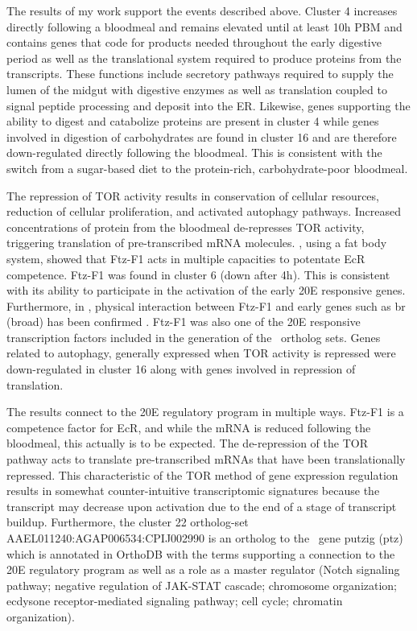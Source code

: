 The results of my work support the events described above.
%
Cluster 4 increases directly following a bloodmeal and remains elevated until at least 10h \gls{PBM} and contains genes that code for products needed throughout the early digestive period as well as the translational system required to produce proteins from the transcripts.
%
These functions include secretory pathways required to supply the lumen of the midgut with digestive enzymes as well as translation coupled to signal peptide processing and deposit into the \gls{ER}.
%
Likewise, genes supporting the ability to digest and catabolize proteins are present in cluster 4 while genes involved in digestion of carbohydrates are found in cluster 16 and are therefore down-regulated directly following the bloodmeal.
%
This is consistent with the switch from a sugar-based diet to the protein-rich, carbohydrate-poor bloodmeal. 


The repression of \gls{TOR} activity results in conservation of cellular resources, reduction of cellular proliferation, and activated autophagy pathways.
%
Increased concentrations of protein from the bloodmeal de-represses \gls{TOR} activity, triggering translation of pre-transcribed mRNA molecules.
%
\citet{Zhu2006}, using a fat body system, showed that Ftz-F1 acts in multiple capacities to potentate \gls{EcR} competence.
%
Ftz-F1 was found in cluster 6 (down after 4h).
%
This is consistent with its ability to participate in the activation of the early \gls{20E} responsive genes.
%
Furthermore, in \Dm, physical interaction between Ftz-F1 and early genes such as br (broad) has been confirmed \cite{Yamada2000}.
%
Ftz-F1 was also one of the \gls{20E} responsive transcription factors included in the generation of the \PTCIe\ ortholog sets.
%
Genes related to autophagy, generally expressed when \gls{TOR} activity is repressed were down-regulated in cluster 16 along with genes involved in repression of translation.

The results connect to the \gls{20E} regulatory program in multiple ways.
%
Ftz-F1 is a competence factor for \gls{EcR}, and while the mRNA is reduced following the bloodmeal, this actually is to be expected.
%
The de-repression of the \gls{TOR} pathway acts to translate pre-transcribed mRNAs that have been translationally repressed.
%
This characteristic of the \gls{TOR} method of gene expression regulation results in somewhat counter-intuitive transcriptomic signatures because the transcript may decrease upon activation due to the end of a stage of transcript buildup.
%
Furthermore, the cluster 22 ortholog-set AAEL011240:AGAP006534:CPIJ002990 is an ortholog to the \Dm\ gene putzig (ptz) which is annotated in OrthoDB with the terms supporting a connection to the \gls{20E} regulatory program as well as a role as a master regulator (Notch signaling pathway; negative regulation of JAK-STAT cascade; chromosome organization; ecdysone receptor-mediated signaling pathway; cell cycle; chromatin organization).

